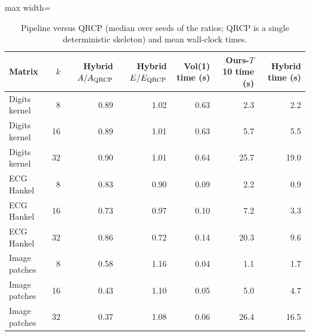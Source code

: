 \begin{table}[t]
\centering\small
\caption{Pipeline versus QRCP (median over seeds of the ratios; QRCP is a single deterministic skeleton) and mean wall-clock times.}\label{tab:realqrcp}
\begin{adjustbox}{max width=\linewidth}
\begin{tabular}{lrrrrrr}
\toprule
Matrix & $k$ & Hybrid $A/A_{\rm QRCP}$ & Hybrid $E/E_{\rm QRCP}$ & Vol(1) time (s) & Ours-$T$10 time (s) & Hybrid time (s) \\
\midrule
Digits kernel & 8 & 0.89 & 1.02 & 0.63 & 2.3 & 2.2 \\
Digits kernel & 16 & 0.89 & 1.01 & 0.63 & 5.7 & 5.5 \\
Digits kernel & 32 & 0.90 & 1.01 & 0.64 & 25.7 & 19.0 \\
ECG Hankel & 8 & 0.83 & 0.90 & 0.09 & 2.2 & 0.9 \\
ECG Hankel & 16 & 0.73 & 0.97 & 0.10 & 7.2 & 3.3 \\
ECG Hankel & 32 & 0.86 & 0.72 & 0.14 & 20.3 & 9.6 \\
Image patches & 8 & 0.58 & 1.16 & 0.04 & 1.1 & 1.7 \\
Image patches & 16 & 0.43 & 1.10 & 0.05 & 5.0 & 4.7 \\
Image patches & 32 & 0.37 & 1.08 & 0.06 & 26.4 & 16.5 \\
\bottomrule
\end{tabular}
\end{adjustbox}
\end{table}
